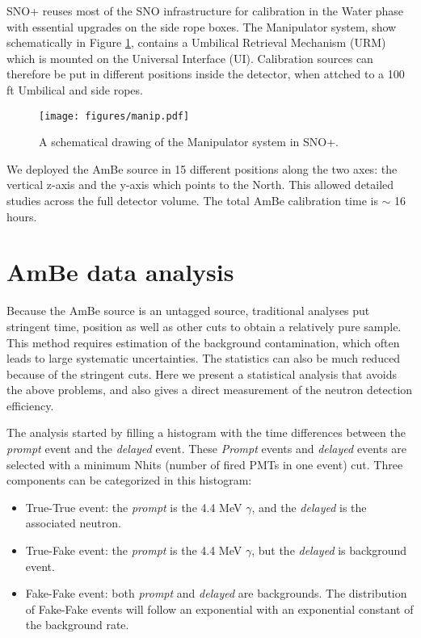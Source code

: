 \documentclass[a4paper]{jpconf}
\begin{document}
SNO+ reuses most of the SNO infrastructure for calibration\cite{Moffat:2005tq} in the Water phase with essential upgrades on the side rope boxes. The Manipulator system, show schematically in Figure \ref{fig:1}, contains a Umbilical Retrieval Mechanism (URM) which is mounted on the Universal Interface (UI). Calibration sources can therefore be put in different positions inside the detector, when attched to a 100 ft Umbilical and side ropes. 

\begin{figure}[h]
\texttt{[image: figures/manip.pdf]}\hspace{2pc}%
\begin{minipage}[b]{14pc}\caption{\label{fig:1}A schematical drawing of the Manipulator system in SNO+.}
\end{minipage}
\end{figure}

We deployed the AmBe source in 15 different positions along the two axes: the vertical z-axis and the y-axis which points to the North. This allowed detailed studies across the full detector volume. The total AmBe calibration time is $\sim$ 16 hours.

\section{AmBe data analysis}

Because the AmBe source is an untagged source, traditional analyses put stringent time, position as well as other cuts to obtain a relatively pure sample. This method requires estimation of the background contamination, which often leads to large systematic uncertainties. The statistics can also be much reduced because of the stringent cuts. Here we present a statistical analysis that avoids the above problems, and also gives a direct measurement of the neutron detection efficiency.

The analysis started by filling a histogram with the time differences between the \textit{prompt} event and the \textit{delayed} event. These \textit{Prompt} events and \textit{delayed} events are selected with a minimum Nhits (number of fired PMTs in one event) cut. Three components can be categorized in this histogram:

\begin{itemize}
\item True-True event: the \textit{prompt} is the 4.4 MeV $\gamma$, and the \textit{delayed} is the associated neutron. 
\item True-Fake event: the \textit{prompt} is the 4.4 MeV $\gamma$, but the \textit{delayed} is background event.
\item Fake-Fake event: both \textit{prompt} and \textit{delayed} are backgrounds. The distribution of Fake-Fake events will follow an exponential with an exponential constant of the background rate.
\end{itemize}
\end{document}
